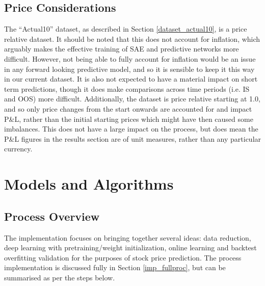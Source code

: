 \documentclass[a4paper,11pt,oneside]{article}
\theoremstyle{plain}
\theoremstyle{definition}
\begin{document}
	\subsection{Price Considerations}\label{data_prices}
	
	The ``Actual10'' dataset, as described in Section \ref{dataset_actual10}, is a price relative dataset. It should be noted that this does not account for inflation, which arguably makes the effective training of SAE and predictive networks more difficult. However, not being able to fully account for inflation would be an issue in any forward looking predictive model, and so it is sensible to keep it this way in our current dataset. It is also not expected to have a material impact on short term predictions, though it does make comparisons across time periods (i.e. IS and OOS) more difficult. Additionally, the dataset is price relative starting at 1.0, and so only price changes from the start onwards are accounted for and impact P\&L, rather than the initial starting prices which might have then caused some imbalances. This does not have a large impact on the process, but does mean the P\&L figures in the results section are of unit measures, rather than any particular currency.
	
	\newpage
	\section{Models and Algorithms}\label{Implementation}
	\subsection{Process Overview}\label{ProcessOverview}\label{imp_overview}
	
	
	The implementation focuses on bringing together several ideas: data reduction, deep learning with pretraining/weight initialization, online learning and backtest overfitting validation for the purposes of stock price prediction. The process implementation is discussed fully in Section \ref{imp_fullproc}, but can be summarised as per the steps below.
	
\end{document}
